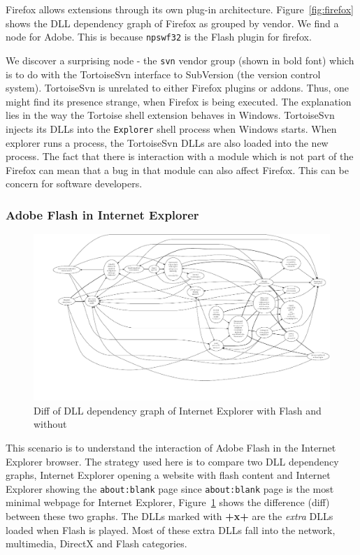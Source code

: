 Firefox allows extensions through its own plug-in architecture.
Figure~\ref{fig:firefox} shows the DLL dependency graph
of Firefox as grouped by vendor. We find a node for Adobe.
This is because {\tt npswf32} is the Flash plugin for firefox.

We discover a surprising node -
the {\tt svn} vendor group (shown in bold font) which is to do with
the TortoiseSvn interface to SubVersion (the version control system).
TortoiseSvn is unrelated to either Firefox plugins or addons.
Thus, one might find its presence strange, when Firefox is being executed.
The explanation lies in the way the Tortoise shell extension
behaves in Windows. TortoiseSvn injects its DLLs into the
{\tt Explorer} shell process when Windows starts.
When explorer runs a process, the TortoiseSvn
DLLs are also loaded into the new process.
The fact that there is interaction with a module which is not part of
the Firefox can mean that a bug in that module can also affect Firefox.
This can be concern for software developers.

\subsubsection{Adobe Flash in Internet Explorer}
\label{sec:flash}

\begin{figure}
\includegraphics[width=1.0\textwidth]{depvis/ie-yt-diff.pdf}
\caption{Diff of DLL dependency graph of Internet Explorer with Flash and without}
\label{fig:ie-diff}
\end{figure}

This scenario is to understand the interaction of Adobe Flash in
the Internet Explorer browser.
The strategy used here is to compare two DLL dependency graphs,
Internet Explorer opening a website with flash content and
Internet Explorer showing the {\tt about:blank} page since
{\tt about:blank} page is the most minimal webpage for Internet Explorer,
Figure~\ref{fig:ie-diff} shows the difference (diff) between these two
graphs.
The DLLs marked with {\bf +x+} are the {\em extra} DLLs loaded
when Flash is played.
Most of these extra DLLs fall into the
network, multimedia, DirectX and Flash categories.

